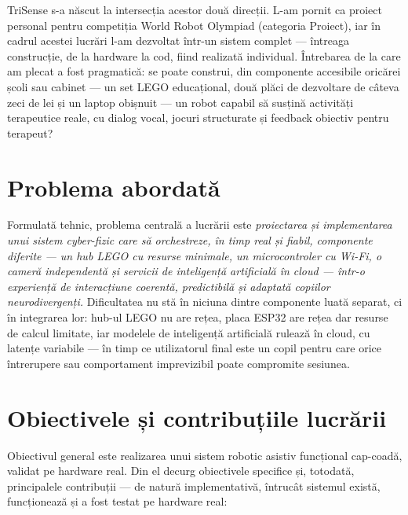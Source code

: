 TriSense s-a născut la intersecția acestor două direcții. L-am pornit ca proiect personal pentru competiția World Robot Olympiad (categoria Proiect), iar în cadrul acestei lucrări l-am dezvoltat într-un sistem complet — întreaga construcție, de la hardware la cod, fiind realizată individual. Întrebarea de la care am plecat a fost pragmatică: se poate construi, din componente accesibile oricărei școli sau cabinet — un set LEGO educațional, două plăci de dezvoltare de câteva zeci de lei și un laptop obișnuit — un robot capabil să susțină activități terapeutice reale, cu dialog vocal, jocuri structurate și feedback obiectiv pentru terapeut?

\section{Problema abordată}

Formulată tehnic, problema centrală a lucrării este \emph{proiectarea și implementarea unui sistem cyber-fizic care să orchestreze, în timp real și fiabil, componente diferite — un hub LEGO cu resurse minimale, un microcontroler cu Wi-Fi, o cameră independentă și servicii de inteligență artificială în cloud — într-o experiență de interacțiune coerentă, predictibilă și adaptată copiilor neurodivergenți.} Dificultatea nu stă în niciuna dintre componente luată separat, ci în integrarea lor: hub-ul LEGO nu are rețea, placa ESP32 are rețea dar resurse de calcul limitate, iar modelele de inteligență artificială rulează în cloud, cu latențe variabile — în timp ce utilizatorul final este un copil pentru care orice întrerupere sau comportament imprevizibil poate compromite sesiunea.

\section{Obiectivele și contribuțiile lucrării}

Obiectivul general este realizarea unui sistem robotic asistiv funcțional cap-coadă, validat pe hardware real. Din el decurg obiectivele specifice și, totodată, principalele contribuții — de natură implementativă, întrucât sistemul există, funcționează și a fost testat pe hardware real:


